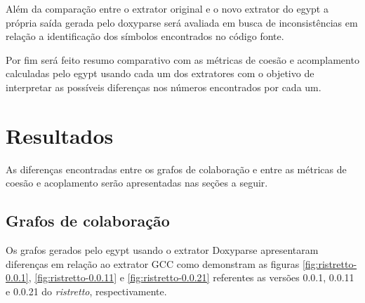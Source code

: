 Além da comparação entre o extrator original e o novo extrator do egypt a
própria saída gerada pelo doxyparse será avaliada em busca de inconsistências
em relação a identificação dos símbolos encontrados no código fonte.

Por fim será feito resumo comparativo com as métricas de coesão e acomplamento
calculadas pelo egypt usando cada um dos extratores com o objetivo de
interpretar as possíveis diferenças nos números encontrados por cada um.

\section{Resultados}

As diferenças encontradas entre os grafos de colaboração e entre as métricas
de coesão e acoplamento serão apresentadas nas seções a seguir.

\subsection{Grafos de colaboração}

Os grafos gerados pelo egypt usando o extrator Doxyparse apresentaram
diferenças em relação ao extrator GCC como demonstram as figuras
\ref{fig:ristretto-0.0.1}, \ref{fig:ristretto-0.0.11} e
\ref{fig:ristretto-0.0.21} referentes as versões 0.0.1, 0.0.11 e 0.0.21 do {\it
ristretto}, respectivamente.


